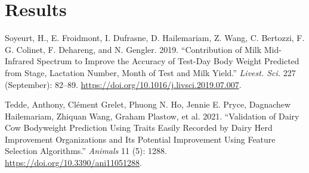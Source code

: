\documentclass[
]{article}
\newlength{\cslhangindent}
\newlength{\cslentryspacingunit} %
\newenvironment{CSLReferences}[2] %
 {%
  \setlength{\parindent}{0pt}
  \ifodd #1
  \let\oldpar\par
  \def\par{\hangindent=\cslhangindent\oldpar}
  \fi
  \setlength{\parskip}{#2\cslentryspacingunit}
 }%
 {}
\begin{document}
\hypertarget{results}{%
\section*{Results}\label{results}}

\hypertarget{refs}{}
\begin{CSLReferences}{1}{0}
\leavevmode{}%
Soyeurt, H., E. Froidmont, I. Dufrasne, D. Hailemariam, Z. Wang, C.
Bertozzi, F. G. Colinet, F. Dehareng, and N. Gengler. 2019.
{``Contribution of Milk Mid-Infrared Spectrum to Improve the Accuracy of
Test-Day Body Weight Predicted from Stage, Lactation Number, Month of
Test and Milk Yield.''} \emph{Livest. Sci.} 227 (September): 82--89.
\url{https://doi.org/10.1016/j.livsci.2019.07.007}.

\leavevmode{}%
Tedde, Anthony, Clément Grelet, Phuong N. Ho, Jennie E. Pryce, Dagnachew
Hailemariam, Zhiquan Wang, Graham Plastow, et al. 2021. {``Validation of
{Dairy} {Cow} {Bodyweight} {Prediction} {Using} {Traits} {Easily}
{Recorded} by {Dairy} {Herd} {Improvement} {Organizations} and {Its}
{Potential} {Improvement} {Using} {Feature} {Selection} {Algorithms}.''}
\emph{Animals} 11 (5): 1288. \url{https://doi.org/10.3390/ani11051288}.

\end{CSLReferences}
\end{document}
